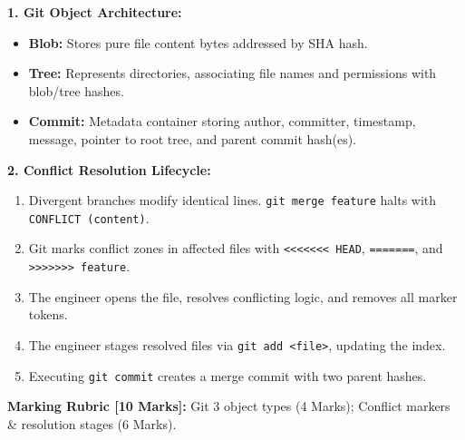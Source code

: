 \begin{examsol}
\textbf{1. Git Object Architecture:}
\begin{itemize}[leftmargin=1.5em]
    \item \textbf{Blob:} Stores pure file content bytes addressed by SHA hash.
    \item \textbf{Tree:} Represents directories, associating file names and permissions with blob/tree hashes.
    \item \textbf{Commit:} Metadata container storing author, committer, timestamp, message, pointer to root tree, and parent commit hash(es).
\end{itemize}

\textbf{2. Conflict Resolution Lifecycle:}
\begin{enumerate}[leftmargin=1.5em]
    \item Divergent branches modify identical lines. \texttt{git merge feature} halts with \texttt{CONFLICT (content)}.
    \item Git marks conflict zones in affected files with \texttt{<<<<<<< HEAD}, \texttt{=======}, and \texttt{>>>>>>> feature}.
    \item The engineer opens the file, resolves conflicting logic, and removes all marker tokens.
    \item The engineer stages resolved files via \texttt{git add <file>}, updating the index.
    \item Executing \texttt{git commit} creates a merge commit with two parent hashes.
\end{enumerate}

\begin{markingrubric}
\textbf{Marking Rubric [10 Marks]:} Git 3 object types (4 Marks); Conflict markers \& resolution stages (6 Marks).
\end{markingrubric}
\end{examsol}
